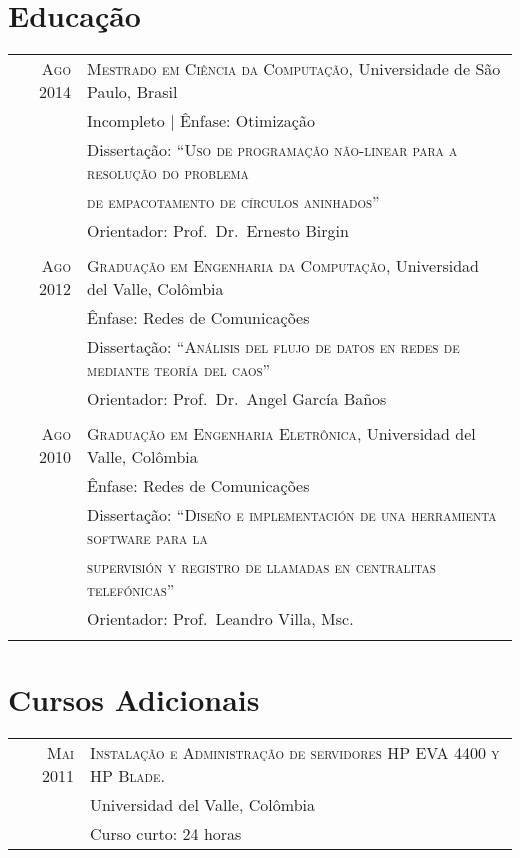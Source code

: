 \documentclass[a4paper,10pt]{article}
\begin{document}
\section{Educação}
\begin{tabular}{rl}	

  \textsc{Ago 2014} & \textsc{Mestrado em Ciência da Computação}, Universidade de São Paulo, Brasil \\
                    & Incompleto | Ênfase: Otimização \\
                    & Dissertação: ``\textsc{Uso de programação não-linear para a resolução do problema}\\
                    & \textsc{de empacotamento de círculos aninhados}'' \\
                    & Orientador: Prof.~Dr.~Ernesto Birgin \\
                    &\\

  \textsc{Ago 2012} & \textsc{Graduação em Engenharia da Computação}, Universidad del Valle, Colômbia \\
                    & Ênfase: Redes de Comunicações \\
                    & Dissertação: ``\textsc{Análisis del flujo de datos en redes de mediante teoría del caos}'' \\
                    & Orientador: Prof.~Dr.~Angel García Baños \\
                    &\\

  \textsc{Ago 2010} & \textsc{Graduação em Engenharia Eletrônica}, Universidad del Valle, Colômbia \\
                    & Ênfase: Redes de Comunicações \\
                    & Dissertação: ``\textsc{Diseño e implementación de una herramienta software para la} \\
                    & \textsc{supervisión y registro de llamadas en centralitas telefónicas}'' \\
                    & Orientador: Prof.~Leandro Villa, Msc. \\
                    &\\

\end{tabular}

\section{Cursos Adicionais}
\begin{tabular}{rl}	

  \textsc{Mai 2011} & \textsc{Instalação e Administração de servidores HP EVA 4400 y HP Blade.} \\
                    & Universidad del Valle, Colômbia \\
                    & Curso curto: 24 horas \\

\end{tabular}
\end{document}
